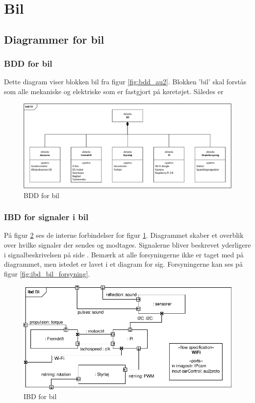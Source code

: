 \section{Bil}

\subsection{Diagrammer for bil}

\subsubsection{BDD for bil} %

Dette diagram viser blokken bil fra figur \ref{fig:bdd_au2}. Blokken 'bil' skal forstås som alle mekaniske og elektriske som er fastgjort på køretøjet. Således er 

\begin{figure}[h]
\centering
\includegraphics[width=\textwidth]{../fig/diagrammer/bil/bdd_bil.pdf}
\caption{BDD for bil}
\label{fig:bdd_bil}
\end{figure}

\subsubsection{IBD for signaler i bil}

På figur \ref{fig:ibd_bil} ses de interne forbindelser for figur \ref{fig:bdd_bil}. Diagrammet skaber et overblik over hvilke signaler der sendes og modtages. Signalerne bliver beskrevet yderligere i signalbeskrivelsen på side \pageref{sec:signalbeskrivelse}. Bemærk at alle forsyningerne ikke er taget med på diagrammet, men istedet er lavet i et diagram for sig. Forsyningerne kan ses på figur \ref{fig:ibd_bil_forsyning}.

\begin{figure}[h]
\centering
\includegraphics[scale=1]{../fig/diagrammer/bil/ibd_bil.pdf}
\caption{IBD for bil}
\label{fig:ibd_bil}
\end{figure}

